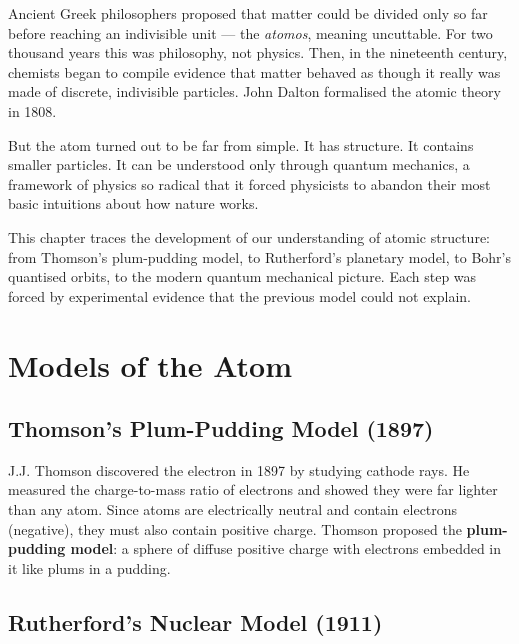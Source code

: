 Ancient Greek philosophers proposed that matter could
be divided only so far before reaching an indivisible
unit --- the \textit{atomos}, meaning uncuttable. For
two thousand years this was philosophy, not physics.
Then, in the nineteenth century, chemists began to
compile evidence that matter behaved as though it
really was made of discrete, indivisible particles.
John Dalton formalised the atomic theory in 1808.

But the atom turned out to be far from simple. It has
structure. It contains smaller particles. It can be
understood only through quantum mechanics, a framework
of physics so radical that it forced physicists to
abandon their most basic intuitions about how nature
works.

This chapter traces the development of our
understanding of atomic structure: from Thomson's
plum-pudding model, to Rutherford's planetary model,
to Bohr's quantised orbits, to the modern quantum
mechanical picture. Each step was forced by
experimental evidence that the previous model could
not explain.

\section{Models of the Atom}

\subsection{Thomson's Plum-Pudding Model (1897)}

J.J. Thomson discovered the electron in 1897 by
studying cathode rays. He measured the charge-to-mass
ratio of electrons and showed they were far lighter
than any atom. Since atoms are electrically neutral
and contain electrons (negative), they must also
contain positive charge. Thomson proposed the
\textbf{plum-pudding model}: a sphere of diffuse
positive charge with electrons embedded in it like
plums in a pudding.

\subsection{Rutherford's Nuclear Model (1911)}

